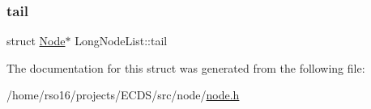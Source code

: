 \mbox{\label{structLongNodeList_ad3e14e3494a357a5973eeae262c932b9}} 
\subsubsection{\texorpdfstring{tail}{tail}}
{\footnotesize\ttfamily struct \hyperlink{structNode}{Node}$\ast$ Long\+Node\+List\+::tail}



The documentation for this struct was generated from the following file\+:\begin{DoxyCompactItemize}
\item 
/home/rso16/projects/\+E\+C\+D\+S/src/node/\hyperlink{node_8h}{node.\+h}\end{DoxyCompactItemize}

